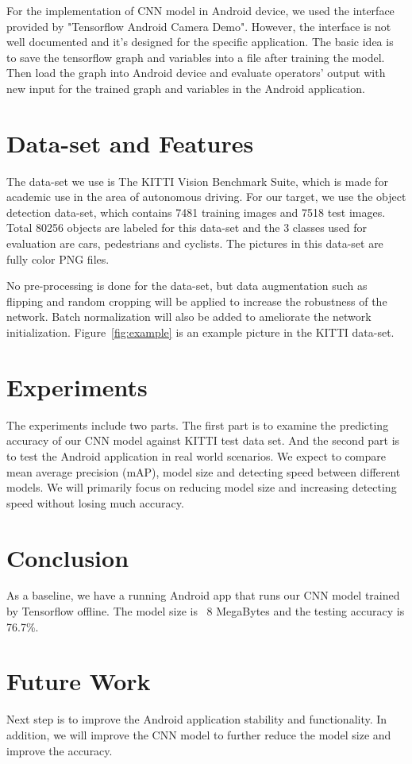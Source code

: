\documentclass[10pt,twocolumn,letterpaper]{article}
\begin{document}
For the implementation of CNN model in Android device, we used the interface provided by "Tensorflow Android Camera Demo". However, the interface is not well documented and it's designed for the specific application. The basic idea is to save the tensorflow graph and variables into a file after training the model. Then load the graph into Android device and evaluate operators' output with new input for the trained graph and variables in the Android application.



\section{Data-set and Features}
The data-set we use is The KITTI Vision Benchmark Suite\cite{geiger2012we}, which is made for academic use in the area of autonomous driving. For our target, we use the object detection data-set, which contains 7481 training images and 7518 test images. Total 80256 objects are labeled for this data-set and the 3 classes used for evaluation are cars, pedestrians and cyclists. The pictures in this data-set are fully color PNG files.\par
No pre-processing is done for the data-set, but data augmentation such as flipping and random cropping will be applied to increase the robustness of the network. Batch normalization will also be added to ameliorate the network initialization. Figure~\ref{fig:example} is an example picture in the KITTI data-set.

\section{Experiments}
The experiments include two parts. The first part is to examine the predicting accuracy of our CNN model against KITTI test data set. 
And the second part is to test the Android application in real world scenarios.
We expect to compare mean average precision (mAP), model size and detecting speed between different models. We will primarily focus on reducing model size and increasing detecting speed without losing much accuracy.

\section{Conclusion}
As a baseline, we have a running Android app that runs our CNN model trained by Tensorflow offline. The model size is ~8 MegaBytes and the testing accuracy is 76.7\%.
\section{Future Work}
Next step is to improve the Android application stability and functionality. In addition, we will improve the CNN model to further reduce the model size and improve the accuracy. 
\newpage
\end{document}

